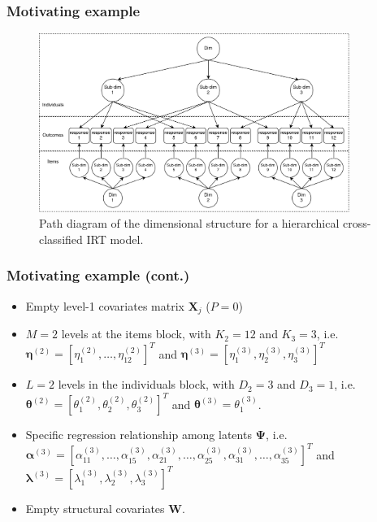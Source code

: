 \documentclass[arial,12pt,xcolor=dvipsnames]{beamer}
\begin{document}
%
\begin{frame}
	\frametitle{Motivating example}
	\begin{figure}[h]
		\centering
		\includegraphics[width=0.9\textwidth]{instrument_design}
		\caption{Path diagram of the dimensional structure for a hierarchical cross-classified IRT model.}
	\end{figure}
\end{frame}
%
\begin{frame}
	\frametitle{Motivating example (cont.)}
	\begin{itemize}
		\item Empty level-1 covariates matrix $\mathbf{X}_{j}$ ($P=0$)
		\item $M=2$ levels at the items block, with $K_{2}=12$ and $K_{3}=3$, i.e. $\pmb{\eta}^{(2)} = [ \eta_{1}^{(2)}, \dots, \eta_{12}^{(2)} ]^{T}$ and $\pmb{\eta}^{(3)} = [ \eta_{1}^{(3)}, \eta_{2}^{(3)}, \eta_{3}^{(3)} ]^{T}$
		\item $L=2$ levels in the individuals block, with $D_{2}=3$ and $D_{3}=1$, i.e. $\pmb{\theta}^{(2)} = [ \theta_{1}^{(2)}, \theta_{2}^{(2)}, \theta_{3}^{(2)} ]^{T}$ and $\pmb{\theta}^{(3)} = \theta_{1}^{(3)}$.
		\item Specific regression relationship among latents $\pmb{\Psi}$, i.e.
		$ \pmb{\alpha}^{(3)} = [ \alpha_{11}^{(3)}, \dots, \alpha_{15}^{(3)}, \alpha_{21}^{(3)}, \dots, \alpha_{25}^{(3)}, \alpha_{31}^{(3)}, \dots, \alpha_{35}^{(3)} ]^{T} $ and  $ \pmb{\lambda}^{(3)} = [ \lambda_{1}^{(3)}, \lambda_{2}^{(3)}, \lambda_{3}^{(3)} ]^{T}$ 
		\item Empty structural covariates $\mathbf{W}$.
	\end{itemize}
\end{frame}
%
%
\end{document}

